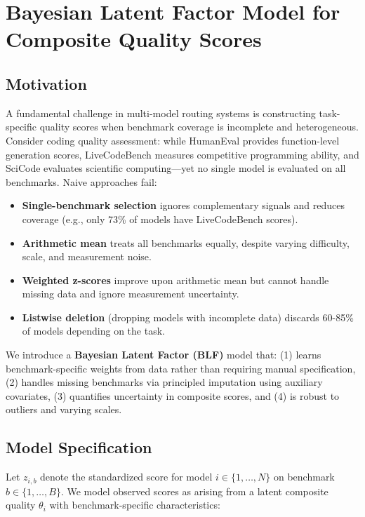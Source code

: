 \section{Bayesian Latent Factor Model for Composite Quality Scores}
\label{sec:blf}

\subsection{Motivation}

A fundamental challenge in multi-model routing systems is constructing task-specific quality scores when benchmark coverage is incomplete and heterogeneous. Consider coding quality assessment: while HumanEval \cite{chen2021codex} provides function-level generation scores, LiveCodeBench \cite{jain2024livecodebench} measures competitive programming ability, and SciCode \cite{tian2024scicode} evaluates scientific computing---yet no single model is evaluated on all benchmarks. Naive approaches fail:

\begin{itemize}
    \item \textbf{Single-benchmark selection} ignores complementary signals and reduces coverage (e.g., only 73\% of models have LiveCodeBench scores).
    \item \textbf{Arithmetic mean} treats all benchmarks equally, despite varying difficulty, scale, and measurement noise.
    \item \textbf{Weighted z-scores} improve upon arithmetic mean but cannot handle missing data and ignore measurement uncertainty.
    \item \textbf{Listwise deletion} (dropping models with incomplete data) discards 60-85\% of models depending on the task.
\end{itemize}

We introduce a \textbf{Bayesian Latent Factor (BLF)} model that: (1) learns benchmark-specific weights from data rather than requiring manual specification, (2) handles missing benchmarks via principled imputation using auxiliary covariates, (3) quantifies uncertainty in composite scores, and (4) is robust to outliers and varying scales.

\subsection{Model Specification}

Let $z_{i,b}$ denote the standardized score for model $i \in \{1, \ldots, N\}$ on benchmark $b \in \{1, \ldots, B\}$. We model observed scores as arising from a latent composite quality $\theta_i$ with benchmark-specific characteristics:

